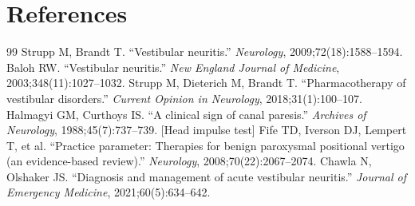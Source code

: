 \section*{References}
\begin{thebibliography}{99}
 Strupp M, Brandt T. ``Vestibular neuritis.'' \textit{Neurology}, 2009;72(18):1588--1594.
 Baloh RW. ``Vestibular neuritis.'' \textit{New England Journal of Medicine}, 2003;348(11):1027--1032.
 Strupp M, Dieterich M, Brandt T. ``Pharmacotherapy of vestibular disorders.'' \textit{Current Opinion in Neurology}, 2018;31(1):100--107.
 Halmagyi GM, Curthoys IS. ``A clinical sign of canal paresis.'' \textit{Archives of Neurology}, 1988;45(7):737--739. [Head impulse test]
 Fife TD, Iverson DJ, Lempert T, et al. ``Practice parameter: Therapies for benign paroxysmal positional vertigo (an evidence-based review).'' \textit{Neurology}, 2008;70(22):2067--2074.
 Chawla N, Olshaker JS. ``Diagnosis and management of acute vestibular neuritis.'' \textit{Journal of Emergency Medicine}, 2021;60(5):634--642.
\end{thebibliography}
